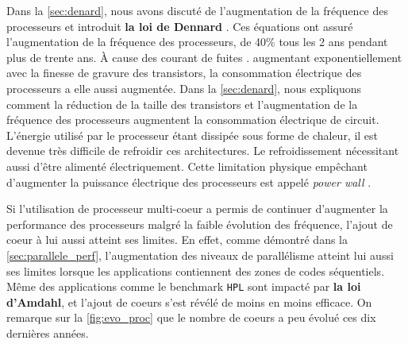                 
                Dans la \autoref{sec:denard}, nous avons discuté de l'augmentation de la fréquence des processeurs et introduit \textbf{la loi de Dennard} \cite{Dennard1974}. Ces équations ont assuré l'augmentation de la fréquence des processeurs, de 40\% tous les 2 ans pendant plus de trente ans. À cause des courant de fuites \cite{Wulf1995}. augmentant exponentiellement avec la finesse de gravure des transistors, la consommation électrique des processeurs a elle aussi augmentée. Dans la \autoref{sec:denard}, nous expliquons comment la réduction de la taille des transistors et l'augmentation de la fréquence des processeurs augmentent la consommation électrique de circuit. L'énergie utilisé par le processeur étant dissipée sous forme de chaleur, il est devenue très difficile de refroidir ces architectures. Le refroidissement nécessitant aussi d'être alimenté électriquement. Cette limitation physique empêchant d'augmenter la puissance électrique des processeurs est appelé \textit{power wall} \cite{Kuroda2001}.
                
                Si l'utilisation de processeur multi-coeur a permis de continuer d'augmenter la performance des processeurs malgré la faible évolution des fréquence, l'ajout de coeur à lui aussi atteint ses limites. En effet, comme démontré dans la \autoref{sec:parallele_perf}, l'augmentation des niveaux de parallélisme atteint lui aussi ses limites lorsque les applications contiennent des zones de codes séquentiels. Même des applications comme le benchmark \verb|HPL| sont impacté par \textbf{la loi d'Amdahl}, et l'ajout de coeurs s'est révélé de moins en moins efficace. On remarque sur la \autoref{fig:evo_proc} que le nombre de coeurs a peu évolué ces dix dernières années.
        
